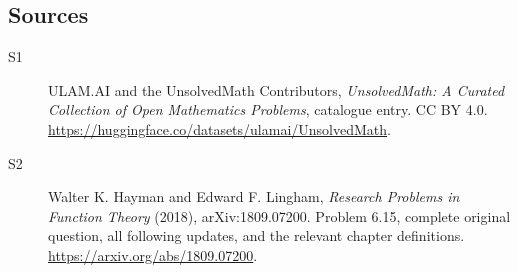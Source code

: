 \documentclass[11pt]{book}
\begin{document}
\subsection{Sources}
\begin{description}
\item[\hypertarget{source:statement:1}{S1}] ULAM.AI and the UnsolvedMath Contributors, \emph{UnsolvedMath: A Curated Collection of Open Mathematics Problems}, catalogue entry. CC BY 4.0. \url{https://huggingface.co/datasets/ulamai/UnsolvedMath}.
\item[\hypertarget{source:statement:2}{S2}] Walter K. Hayman and Edward F. Lingham, \emph{Research Problems in Function Theory} (2018), arXiv:1809.07200. Problem 6.15, complete original question, all following updates, and the relevant chapter definitions. \url{https://arxiv.org/abs/1809.07200}.
\end{description}
\label{end:statement}
\end{document}
